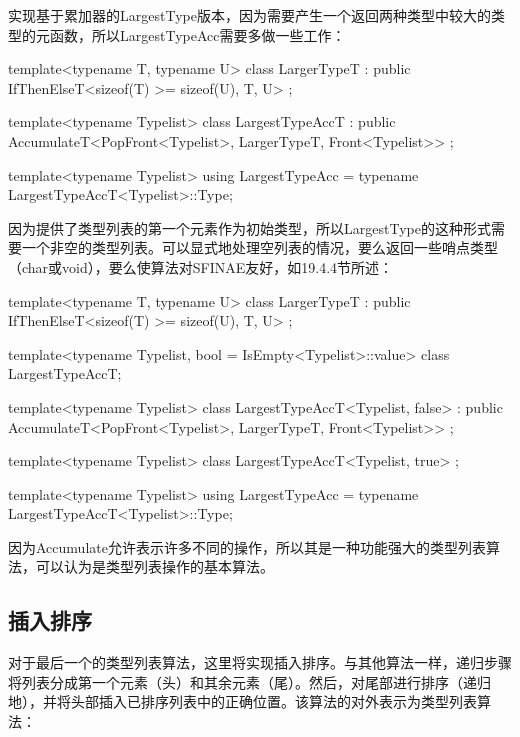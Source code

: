 实现基于累加器的LargestType版本，因为需要产生一个返回两种类型中较大的类型的元函数，所以LargestTypeAcc需要多做一些工作：

\begin{cpp}
template<typename T, typename U>
class LargerTypeT
: public IfThenElseT<sizeof(T) >= sizeof(U), T, U>
{
};

template<typename Typelist>
class LargestTypeAccT
: public AccumulateT<PopFront<Typelist>, LargerTypeT,
Front<Typelist>>
{
};

template<typename Typelist>
using LargestTypeAcc = typename LargestTypeAccT<Typelist>::Type;
\end{cpp}

因为提供了类型列表的第一个元素作为初始类型，所以LargestType的这种形式需要一个非空的类型列表。可以显式地处理空列表的情况，要么返回一些哨点类型（char或void），要么使算法对SFINAE友好，如19.4.4节所述：

\begin{cpp}
template<typename T, typename U>
class LargerTypeT
: public IfThenElseT<sizeof(T) >= sizeof(U), T, U>
{
};

template<typename Typelist, bool = IsEmpty<Typelist>::value>
class LargestTypeAccT;

template<typename Typelist>
class LargestTypeAccT<Typelist, false>
: public AccumulateT<PopFront<Typelist>, LargerTypeT,
					Front<Typelist>>
{
};

template<typename Typelist>
class LargestTypeAccT<Typelist, true>
{
};

template<typename Typelist>
using LargestTypeAcc = typename LargestTypeAccT<Typelist>::Type;
\end{cpp}

因为Accumulate允许表示许多不同的操作，所以其是一种功能强大的类型列表算法，可以认为是类型列表操作的基本算法。

\subsection{插入排序}

对于最后一个的类型列表算法，这里将实现插入排序。与其他算法一样，递归步骤将列表分成第一个元素（头）和其余元素（尾）。然后，对尾部进行排序（递归地），并将头部插入已排序列表中的正确位置。该算法的对外表示为类型列表算法：

